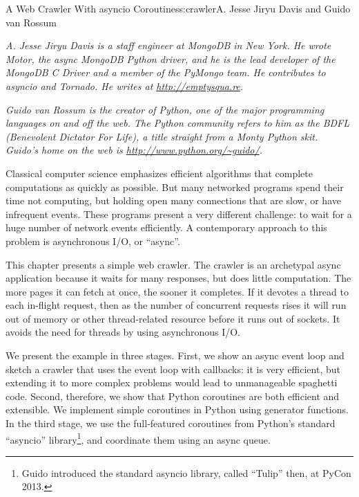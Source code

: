 \begin{aosachapter}{A Web Crawler With asyncio Coroutines}{s:crawler}{A. Jesse Jiryu Davis and Guido van Rossum}

\emph{A. Jesse Jiryu Davis is a staff engineer at MongoDB in New York.
He wrote Motor, the async MongoDB Python driver, and he is the lead
developer of the MongoDB C Driver and a member of the PyMongo team. He
contributes to asyncio and Tornado. He writes at
\url{http://emptysqua.re}.}

\emph{Guido van Rossum is the creator of Python, one of the major
programming languages on and off the web. The Python community refers to
him as the BDFL (Benevolent Dictator For Life), a title straight from a
Monty Python skit. Guido's home on the web is
\url{http://www.python.org/~guido/}.}

\label{introduction}

Classical computer science emphasizes efficient algorithms that complete
computations as quickly as possible. But many networked programs spend
their time not computing, but holding open many connections that are
slow, or have infrequent events. These programs present a very different
challenge: to wait for a huge number of network events efficiently. A
contemporary approach to this problem is asynchronous I/O, or ``async''.

This chapter presents a simple web crawler. The crawler is an archetypal
async application because it waits for many responses, but does little
computation. The more pages it can fetch at once, the sooner it
completes. If it devotes a thread to each in-flight request, then as the
number of concurrent requests rises it will run out of memory or other
thread-related resource before it runs out of sockets. It avoids the
need for threads by using asynchronous I/O.

We present the example in three stages. First, we show an async event
loop and sketch a crawler that uses the event loop with callbacks: it is
very efficient, but extending it to more complex problems would lead to
unmanageable spaghetti code. Second, therefore, we show that Python
coroutines are both efficient and extensible. We implement simple
coroutines in Python using generator functions. In the third stage, we
use the full-featured coroutines from Python's standard ``asyncio''
library\footnote{Guido introduced the standard asyncio library, called
  ``Tulip'' then, at PyCon 2013.}, and coordinate them using an async
queue.

\label{the-task}


\end{aosachapter}
